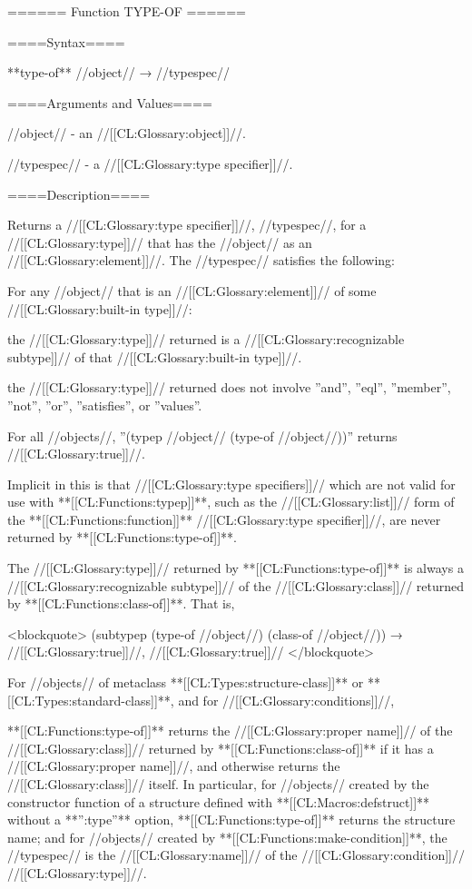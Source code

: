 ====== Function TYPE-OF ======

====Syntax====

**type-of** //object// → //typespec//

====Arguments and Values====

//object// - an //[[CL:Glossary:object]]//.

//typespec// - a //[[CL:Glossary:type specifier]]//.

====Description====


Returns a //[[CL:Glossary:type specifier]]//, //typespec//, for a //[[CL:Glossary:type]]// that has the //object// as an //[[CL:Glossary:element]]//. The //typespec// satisfies the following:

\beginlist

 For any //object// that is an //[[CL:Glossary:element]]// of some //[[CL:Glossary:built-in type]]//:

\beginlist {} the //[[CL:Glossary:type]]// returned is a //[[CL:Glossary:recognizable subtype]]// of that //[[CL:Glossary:built-in type]]//.


the //[[CL:Glossary:type]]// returned does not involve ''and'', ''eql'', ''member'', ''not'', ''or'', ''satisfies'', or ''values''. \endlist

 For all //objects//, ''(typep //object// (type-of //object//))'' returns //[[CL:Glossary:true]]//.

Implicit in this is that //[[CL:Glossary:type specifiers]]// which are not valid for use with **[[CL:Functions:typep]]**, such as the //[[CL:Glossary:list]]// form of the **[[CL:Functions:function]]** //[[CL:Glossary:type specifier]]//, are never returned by **[[CL:Functions:type-of]]**.

 The //[[CL:Glossary:type]]// returned by **[[CL:Functions:type-of]]** is always a //[[CL:Glossary:recognizable subtype]]// of the //[[CL:Glossary:class]]// returned by **[[CL:Functions:class-of]]**. That is,

<blockquote> (subtypep (type-of //object//) (class-of //object//)) → //[[CL:Glossary:true]]//, //[[CL:Glossary:true]]// </blockquote>

 For //objects// of metaclass **[[CL:Types:structure-class]]** or **[[CL:Types:standard-class]]**, and for //[[CL:Glossary:conditions]]//,

**[[CL:Functions:type-of]]** returns the //[[CL:Glossary:proper name]]// of the //[[CL:Glossary:class]]// returned by **[[CL:Functions:class-of]]** if it has a //[[CL:Glossary:proper name]]//, and otherwise returns the //[[CL:Glossary:class]]// itself. In particular, for //objects// created by the constructor function of a structure defined with **[[CL:Macros:defstruct]]** without a **'':type''** option, **[[CL:Functions:type-of]]** returns the structure name; and for //objects// created by **[[CL:Functions:make-condition]]**, the //typespec// is the //[[CL:Glossary:name]]// of the //[[CL:Glossary:condition]]// //[[CL:Glossary:type]]//.


